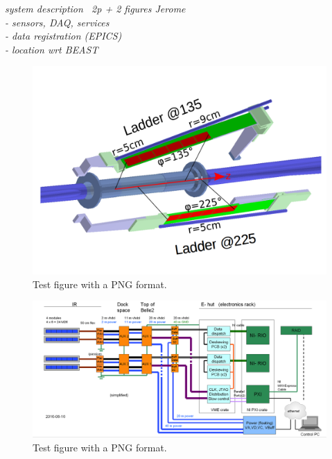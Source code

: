 {\it system description ~2p + 2 figures  Jerome\\
     - sensors, DAQ, services\\
     - data registration (EPICS)\\
     - location wrt BEAST
}

\begin{figure}[!h]
\centering
\includegraphics[width=\linewidth]{plumeGeometry_simplified.png}
\caption{Test figure with a PNG format.}
\label{fig:geometry}
\end{figure}

\begin{figure}[!h]
\centering
\includegraphics[width=\linewidth]{systemSchematic.png}
\caption{Test figure with a PNG format.}
\label{fig:system}
\end{figure}
